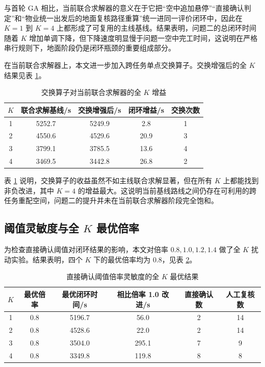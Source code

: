 \documentclass[12pt]{article}
\begin{document}
与首轮 GA 相比，当前联合求解器的意义在于它把“空中追加悬停”“直接确认判定”和“物业统一出发后的地面复核路径重算”统一进同一评价闭环中，因此在 $K=1$ 到 $K=4$ 上都形成了可复用的主线基线。结果表明，问题二的总闭环时间随着 $K$ 增加单调下降，但下降速度明显慢于问题一空中完工时间，这说明在严格串行规则下，地面阶段仍是闭环瓶颈的重要组成部分。

在当前联合求解器上，本文进一步加入跨任务单点交换算子。交换增强后的全 $K$ 结果见表 \ref{tab:problem2-swap-fullk}。

\begin{table}[H]
\centering
\caption{交换算子对当前联合求解器的全 $K$ 增益}
\label{tab:problem2-swap-fullk}
\begin{tabular}{ccccc}
\toprule
$K$ & 联合求解基线/s & 交换增强后/s & 闭环增益/s & 交换次数 \\
\midrule
1 & 5252.7 & 5249.9 & 2.8 & 1 \\
2 & 4550.6 & 4529.6 & 20.9 & 3 \\
3 & 3799.1 & 3785.5 & 13.6 & 4 \\
4 & 3469.5 & 3442.8 & 26.8 & 2 \\
\bottomrule
\end{tabular}
\end{table}

表 \ref{tab:problem2-swap-fullk} 说明，交换算子的收益虽然不如主线联合求解显著，但在所有 $K$ 上都能找到非负改进，其中 $K=4$ 的增益最大。这说明当前基线路线之间仍存在可利用的跨任务重配空间，问题二的提升并未在当前联合求解器阶段完全饱和。

\subsection{阈值灵敏度与全 $K$ 最优倍率}
为检查直接确认阈值对闭环结果的影响，本文对倍率 $0.8,1.0,1.2,1.4$ 做了全 $K$ 扰动实验。结果表明，四个 $K$ 下的最优倍率均为 $0.8$，见表 \ref{tab:problem2-threshold-best-fullk}。

\begin{table}[H]
\centering
\caption{直接确认阈值倍率灵敏度的全 $K$ 最优结果}
\label{tab:problem2-threshold-best-fullk}
\begin{tabular}{cccccc}
\toprule
$K$ & 最优倍率 & 最优闭环时间/s & 相比倍率 1.0 改进/s & 直接确认数 & 人工复核数 \\
\midrule
1 & 0.8 & 5196.7 & 56.0 & 2 & 14 \\
2 & 0.8 & 4528.6 & 22.0 & 2 & 14 \\
3 & 0.8 & 3504.0 & 295.1 & 7 & 9 \\
4 & 0.8 & 3349.8 & 119.8 & 8 & 8 \\
\bottomrule
\end{tabular}
\end{table}
\end{document}
